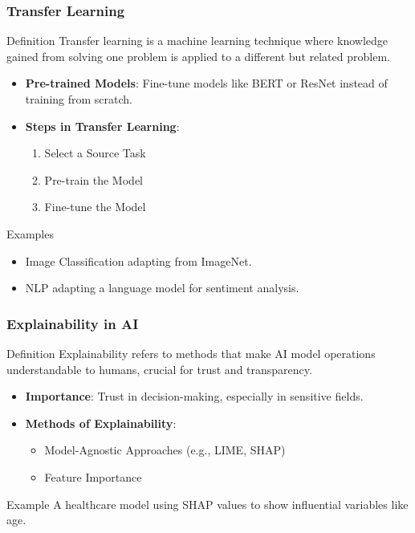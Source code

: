 \documentclass[aspectratio=169]{beamer}
\begin{document}
\begin{frame}[fragile]
    \frametitle{Transfer Learning}
    \begin{block}{Definition}
        Transfer learning is a machine learning technique where knowledge gained from solving one problem is applied to a different but related problem.
    \end{block}
    
    \begin{itemize}
        \item \textbf{Pre-trained Models}: Fine-tune models like BERT or ResNet instead of training from scratch.
        \item \textbf{Steps in Transfer Learning}:
        \begin{enumerate}
            \item Select a Source Task
            \item Pre-train the Model
            \item Fine-tune the Model
        \end{enumerate}
    \end{itemize}
    
    \begin{block}{Examples}
        \begin{itemize}
            \item Image Classification adapting from ImageNet.
            \item NLP adapting a language model for sentiment analysis. 
        \end{itemize}
    \end{block}
\end{frame}

\begin{frame}[fragile]
    \frametitle{Explainability in AI}
    \begin{block}{Definition}
        Explainability refers to methods that make AI model operations understandable to humans, crucial for trust and transparency.
    \end{block}
    
    \begin{itemize}
        \item \textbf{Importance}: Trust in decision-making, especially in sensitive fields.
        \item \textbf{Methods of Explainability}:
        \begin{itemize}
            \item Model-Agnostic Approaches (e.g., LIME, SHAP)
            \item Feature Importance
        \end{itemize}
    \end{itemize}
    
    \begin{block}{Example}
        A healthcare model using SHAP values to show influential variables like age.
    \end{block}
\end{frame}
\end{document}
